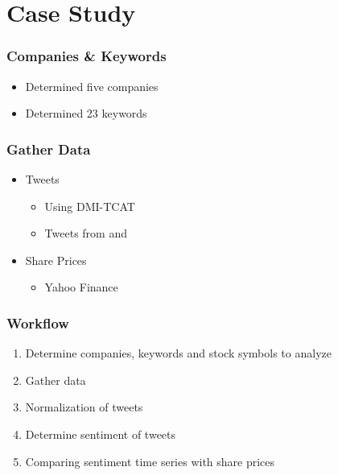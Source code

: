 
\section{Case Study}

\begin{frame}
  \frametitle{Companies \& Keywords}

  \begin{itemize}
    \item Determined five companies
    \item Determined 23 keywords
  \end{itemize}
\end{frame}


\begin{frame}
  \frametitle{Gather Data}

  \begin{itemize}
    \item Tweets
      \begin{itemize}
        \item Using DMI-TCAT
        \item Tweets from  and 
      \end{itemize}
    
    \item Share Prices
      \begin{itemize}
        \item Yahoo Finance
      \end{itemize}
    
  \end{itemize}

\end{frame}


\begin{frame}
    \frametitle{Workflow}

    \begin{enumerate}
        \item Determine companies, keywords and stock symbols to analyze
        \item Gather data
        \item Normalization of tweets
        \item Determine sentiment of tweets
        \item Comparing sentiment time series with share prices
    \end{enumerate}
\end{frame}

